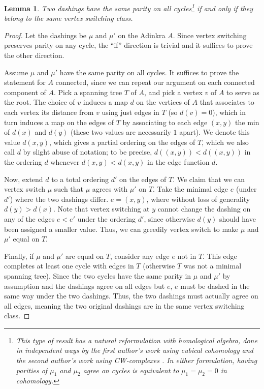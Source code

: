 \documentclass[12pt,twoside,singlespace]{article}
\numberwithin{equation}{section}
\newtheorem{lem}[equation]{Lemma}
\theoremstyle{definition}
\begin{document}
\begin{lem}
\label{lem:cycles-switching-class}
Two dashings have the same parity on all cycles\footnote{This type of result has a natural reformulation with homological algebra, done in independent ways by the first author's work using cubical cohomology \cite{dil:cohomology} and the second author's work using CW-complexes \cite{zhang:adinkras}. In either formulation, having parities of $\mu_1$ and $\mu_2$ agree on cycles is equivalent to $\mu_1 = \mu_2 = 0$ in cohomology.} if and only if they belong to the same vertex switching class.
\end{lem}

\begin{proof}
Let the dashings be $\mu$ and $\mu'$ on the Adinkra $A$. Since vertex switching preserves parity on any cycle, the ``if'' direction is trivial and it suffices to prove the other direction.

Assume $\mu$ and $\mu'$ have the same parity on all cycles. It suffices to prove the statement for $A$ connected, since we can repeat our argument on each connected component of $A$. Pick a spanning tree $T$ of $A$, and pick a vertex $v$ of $A$ to serve as the root. The choice of $v$ induces a map $d$ on the vertices of $A$ that associates to each vertex its distance from $v$ using just edges in $T$ (so $d(v) = 0$), which in turn induces a map on the edges of $T$ by associating to each edge $(x,y)$ the min of $d(x)$ and $d(y)$ (these two values are necessarily $1$ apart). We denote this value $d(x,y)$, which gives a partial ordering on the edges of $T$, which we also call $d$ by slight abuse of notation; to be precise, $d((x,y)) < d((x,y))$ in the ordering $d$ whenever $d(x,y) < d(x,y)$ in the edge function $d$.

Now, extend $d$ to a total ordering $d'$ on the edges of $T$. We claim that we can vertex switch $\mu$ such that $\mu$ agrees with $\mu'$ on $T$. Take the minimal edge $e$ (under $d'$) where the two dashings differ. $e = (x,y)$, where without loss of generality $d(y) > d(x)$. Note that vertex switching at $y$ cannot change the dashing on any of the edges $e < e'$ under the ordering $d'$, since otherwise $d(y)$ should have been assigned a smaller value. Thus, we can greedily vertex switch to make $\mu$ and $\mu'$ equal on $T$.

Finally, if $\mu$ and $\mu'$ are equal on $T$, consider any edge $e$ not in $T$. This edge completes at least one cycle with edges in $T$ (otherwise $T$ was not a minimal spanning tree). Since the two cycles have the same parity in $\mu$ and $\mu'$ by assumption and the dashings agree on all edges but $e$, $e$ must be dashed in the same way under the two dashings. Thus, the two dashings must actually agree on all edges, meaning the two original dashings are in the same vertex switching class.

\end{proof}
\end{document}

